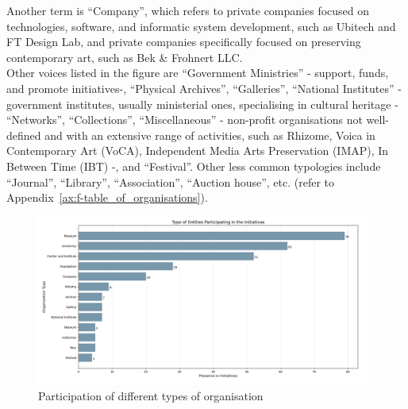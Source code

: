 Another term is ``Company'', which refers to private companies focused on technologies, software, and informatic system development, such as Ubitech and FT Design Lab, and private companies specifically focused on preserving contemporary art, such as Bek \& Frohnert LLC.\\
Other voices listed in the figure are ``Government Ministries'' - support, funds, and promote initiatives-, ``Physical Archives'', ``Galleries'', ``National Institutes'' - government institutes, usually ministerial ones, specialising in cultural heritage - ``Networks'', ``Collections'', ``Miscellaneous'' - non-profit organisations not well-defined and with an extensive range of activities, such as Rhizome, Voica in Contemporary Art (VoCA), Independent Media Arts Preservation (IMAP), In Between Time (IBT) -, and ``Festival''. Other less common typologies include ``Journal'', ``Library'', ``Association'', ``Auction house'', etc. (refer to Appendix~\ref{ax:f-table_of_organisations}).

\begin{figure}[!h]
    \centering
    \includegraphics[width=\textwidth]{chapters/1-state_of_the_art/image/plot01-orgtypes.png}
    \caption{Participation of different types of organisation}
    \label{fig:c1-org_type}
\end{figure}


